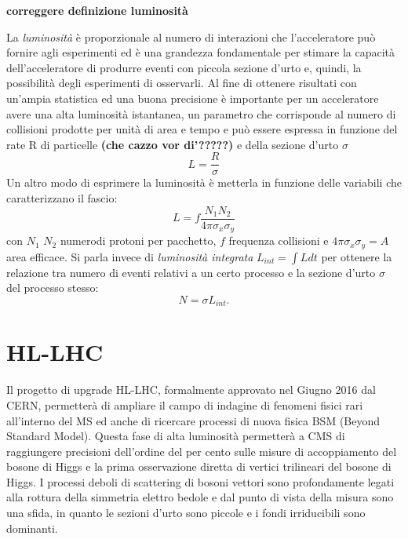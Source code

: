 {\bf correggere definizione luminosit\`a}

La {\em luminosit\`a} \`e proporzionale al numero di interazioni che l'acceleratore pu\`o fornire agli esperimenti ed \`e una grandezza fondamentale per stimare la capacit\`a dell'acceleratore di produrre eventi con piccola sezione d'urto e, quindi, la possibilit\`a degli esperimenti di osservarli. Al fine di ottenere risultati con un'ampia statistica ed una buona precisione è importante per un acceleratore avere una alta luminosità istantanea, un parametro che corrisponde al numero di collisioni prodotte per unità di area e tempo e può essere espressa in funzione del rate R di particelle {\bf(che cazzo vor di'?????)} e della sezione d'urto $\sigma$ 
\begin{equation}
L=\frac{R}{\sigma}
\end{equation}
Un altro modo di esprimere la luminosità è metterla in funzione delle variabili che caratterizzano il fascio:
\begin{equation}
L = f \frac{N_1 N_2}{4 \pi \sigma_x \sigma_y}
\end{equation}
con $N_1$ $N_2$ numerodi protoni per pacchetto, $f$ frequenza collisioni e $4\pi \sigma_x \sigma_y =A$ area efficace. Si parla invece di {\em luminosità integrata} $L_{int}=\int L dt$ per ottenere la relazione tra numero di eventi relativi a un certo processo e la sezione d'urto $\sigma$ del processo stesso:
\begin{equation}
N=\sigma L_{int}.
\end{equation}

\section{HL-LHC}
Il progetto di upgrade HL-LHC, formalmente approvato nel Giugno 2016 dal CERN, permetter\`a di ampliare il campo di indagine di fenomeni fisici rari all'interno del MS ed anche di ricercare processi di nuova fisica BSM (Beyond Standard Model). Questa fase di alta luminosità permetterà a CMS di raggiungere precisioni dell'ordine del per cento sulle misure di accoppiamento del bosone di Higgs e la prima osservazione diretta di vertici trilineari del bosone di Higgs. 
I processi deboli di scattering di bosoni vettori sono profondamente legati alla rottura della simmetria elettro bedole e dal punto di vista della misura sono una sfida, in quanto le sezioni d'urto sono piccole e i fondi irriducibili sono dominanti. 

